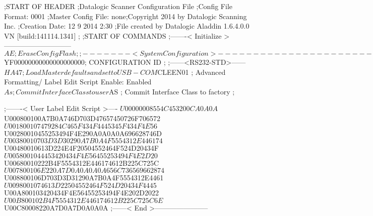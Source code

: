 ;START OF HEADER
;Datalogic Scanner Configuration File
;Config File Format: 0001
;Master Config File: none;Copyright 2014 by Datalogic Scanning Inc.
;Creation Date: 12 9 2014 2:30
;File created by Datalogic Aladdin 1.6.4.0.0 VN [build:141114.1341]
;
;START OF COMMANDS
;-------< Initialize >-----------------------------
$AE                 ; Erase Config Flash
;
;-------< System Configuration >-------------------------------
$YF00000000000000000000; CONFIGURATION ID
;
;------<RS232-STD>------
$HA47               ; Load Master defaults and set to USB-COM
$CLEEN01            ; Advanced Formatting/ Label Edit Script Enable: Enabled
$As                 ; Commit Interface Class to user
$AS                 ; Commit Interface Class to factory
;

;-------< User Label Edit Script >----
$U00000008554C453200CA0A0A
$U000800100A7B0A746D703D47657450726F706572
$U001800107479284C465F434F4445345F434F4E56
$U00280010455253494F4E290A0A0A0A696628746D
$U00380010703D3D30290A7B0A4F5554312E446174
$U00480010613D224E4F20504552464F524D20434F
$U0058001044453420434F4E56455253494F4E2D20
$U00680010222B4F5554312E446174612B225C725C
$U007800106E220A7D0A0A0A0A656C736569662874
$U008800106D703D3D31290A7B0A4F5554312E4461
$U0098001074613D22504552464F524D20434F4445
$U00A800103420434F4E56455253494F4E202D2022
$U00B800102B4F5554312E446174612B225C725C6E
$U00C80008220A7D0A7D0A0A0A
;------< End >-----------------------
